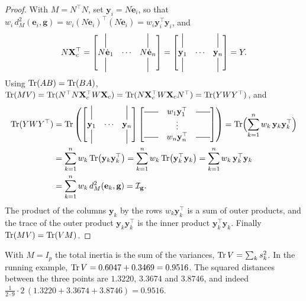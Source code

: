 \begin{notechapter}
\begin{proof}
With $M = N^\top N$, set $\mathbf y_i = N\dot{\mathbf e}_i$, so that
$w_i\,d_M^2(\mathbf e_i,\mathbf g) = w_i(N\dot{\mathbf e}_i)^\top(N\dot{\mathbf e}_i) = w_i\mathbf y_i^\top\mathbf y_i$, and
\[
  N\mathbf X_c^\top =
  \begin{bmatrix}
    \vertbar & & \vertbar\\
    N\dot{\mathbf e}_1 & \cdots & N\dot{\mathbf e}_n\\
    \vertbar & & \vertbar
  \end{bmatrix}
  =
  \begin{bmatrix}
    \vertbar & & \vertbar\\
    \mathbf y_1 & \cdots & \mathbf y_n\\
    \vertbar & & \vertbar
  \end{bmatrix}
  = Y .
\]
Using $\operatorname{Tr}(AB) = \operatorname{Tr}(BA)$,
$\operatorname{Tr}(MV) = \operatorname{Tr}(N^\top N\mathbf X_c^\top W\mathbf X_c) = \operatorname{Tr}(N\mathbf X_c^\top W\mathbf X_cN^\top) = \operatorname{Tr}(YWY^\top)$, and
\begin{align*}
  \Tr(YWY^\top)
  &= \Tr\left(
    \begin{bmatrix}
      \vertbar & & \vertbar\\
      \mathbf y_1 & \cdots & \mathbf y_n\\
      \vertbar & & \vertbar
    \end{bmatrix}
    \begin{bmatrix}
      \horzbar & w_1\mathbf y_1^\top & \horzbar\\
       & \vdots & \\
      \horzbar & w_n\mathbf y_n^\top & \horzbar
    \end{bmatrix}\right)
  = \Tr\Bigl(\sum_{k=1}^nw_k\,\mathbf y_k\mathbf y_k^\top\Bigr)\\
  &= \sum_{k=1}^nw_k\Tr\bigl(\mathbf y_k\mathbf y_k^\top\bigr)
  = \sum_{k=1}^nw_k\Tr\bigl(\mathbf y_k^\top\mathbf y_k\bigr)
  = \sum_{k=1}^nw_k\,\mathbf y_k^\top\mathbf y_k\\
  &= \sum_{k=1}^nw_k\,d_M^2(\mathbf e_k,\mathbf g) = \mathcal I_{\mathbf g}.
\end{align*}
The product of the columns $\mathbf y_k$ by the rows $w_k\mathbf y_k^\top$ is a sum of outer
products, and the trace of the outer product $\mathbf y_k\mathbf y_k^\top$ is the inner product
$\mathbf y_k^\top\mathbf y_k$. Finally $\operatorname{Tr}(MV) = \operatorname{Tr}(VM)$.
\end{proof}

With $M = I_p$ the total inertia is the sum of the variances, $\operatorname{Tr} V = \sum_ks_k^2$. In the
running example, $\operatorname{Tr} V = 0.6047 + 0.3469 = 0.9516$. The squared distances between the
three points are $1.3220$, $3.3674$ and $3.8746$, and indeed
$\frac1{2\cdot9}\cdot2\,(1.3220 + 3.3674 + 3.8746) = 0.9516$.


\end{notechapter}
